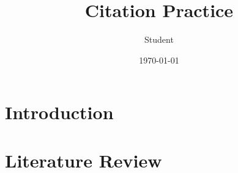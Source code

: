 \documentclass[12pt,a4paper]{article}
\title{Citation Practice}
\author{Student}
\date{\today}
\begin{document}
\maketitle

\section{Introduction}



\section{Literature Review}



\end{document}
